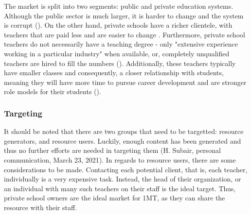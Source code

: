 \documentclass[letterpaper]{article}
\begin{document}
            The market is split into two segments: public and private education systems. Although the public sector is much larger, it is harder to change and the system is corrupt (\cite{segmentation-corruption}). On the other hand, private schools have a richer clientele, with teachers that are paid less and are easier to change \cite{private-public-salaries}. Furthermore, private school teachers do not necessarily have a teaching degree - only "extensive experience working in a particular industry" when available, or, completely unqualified teachers are hired to fill the numbers (\cite{private-public-salaries}). Additionally, these teachers typically have smaller classes and consequently, a closer relationship with students, meaning they will have more time to pursue career development and are stronger role models for their students (\cite{private-public-salaries}). 
            
        \subsubsection{Targeting}
            
            It should be noted that there are two groups that need to be targetted: resource generators, and resource users. Luckily, enough content has been generated and thus no further efforts are needed in targeting them (H. Subair, personal communication, March 23, 2021). In regards to resource users, there are some considerations to be made. Contacting each potential client, that is, each teacher, individually is a very expensive task. Instead, the head of their organization, or an individual with many such teachers on their staff is the ideal target. Thus, private school owners are the ideal market for 1MT, as they can share the resource with their staff.
\end{document}
